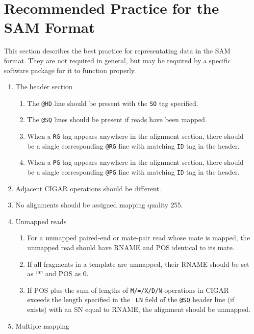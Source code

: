 \documentclass[10pt]{article}
\begin{document}
\pagebreak

\section{Recommended Practice for the SAM Format}
This section describes the best practice for representating data in the
SAM format. They are not required in general, but may be required by a
specific software package for it to function properly.

\begin{enumerate}
\item The header section
  \begin{enumerate}[label*=\arabic*]
  \item The {\tt @HD} line should be present with the {\tt SO} tag specified.
  \item The {\tt @SQ} lines should be present if reads have been mapped.
  \item When a {\tt RG} tag appears anywhere in the alignment section,
    there should be a single corresponding {\tt @RG} line with matching
    {\tt ID} tag in the header.
  \item When a {\tt PG} tag appears anywhere in the alignment section,
    there should be a single corresponding {\tt @PG} line with matching
    {\tt ID} tag in the header.
  \end{enumerate}
\item Adjacent CIGAR operations should be different.
\item No alignments should be assigned mapping quality 255.
\item Unmapped reads
  \begin{enumerate}[label*=\arabic*]
  \item For a unmapped paired-end or mate-pair read whose mate is
    mapped, the unmapped read should have {\sf RNAME} and {\sf POS}
    identical to its mate.
  \item If all fragments in a template are unmapped, their {\sf RNAME}
    should be set as `*' and {\sf POS} as 0.
  \item If {\sf POS} plus the sum of lengths of {\tt M/=/X/D/N}
    operations in {\sf CIGAR} exceeds the length specified in the {\tt
      LN} field of the {\tt @SQ} header line (if exists) with an SN
    equal to {\sf RNAME}, the alignment should be unmapped.
  \end{enumerate}
\item Multiple mapping
  \begin{enumerate}[label*=\arabic*]

\end{enumerate}
\end{enumerate}
\end{document}

